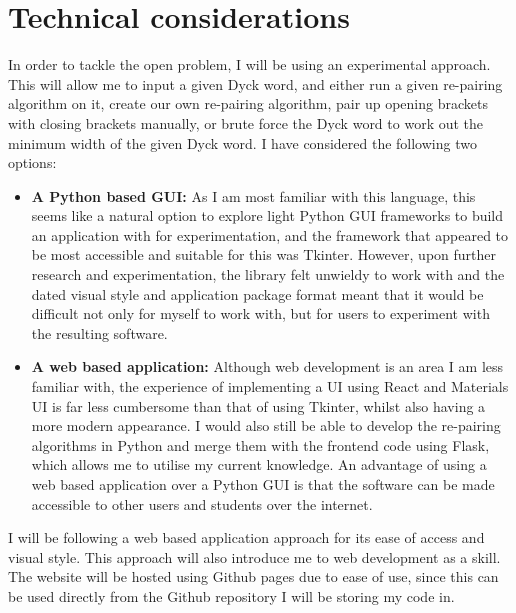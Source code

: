 \documentclass[a4paper]{article}
\begin{document}
\section{Technical considerations}
In order to tackle the open problem, I will be using an experimental approach. This will allow me to input a given Dyck word, and either run a given re-pairing algorithm on it, create our own re-pairing algorithm, pair up opening brackets with closing brackets manually, or brute force the Dyck word to work out the minimum width of the given Dyck word. I have considered the following two options:
\begin{itemize}
	\item \textbf{A Python based GUI:} As I am most familiar with this language, this seems like a natural option to explore light Python GUI frameworks to build an application with for experimentation, and the framework that appeared to be most accessible and suitable for this was Tkinter. However, upon further research and experimentation, the library felt unwieldy to work with and the dated visual style and application package format meant that it would be difficult not only for myself to work with, but for users to experiment with the resulting software.
	\item \textbf{A web based application:} Although web development is an area I am less familiar with, the experience of implementing a UI using React and Materials UI is far less cumbersome than that of using Tkinter, whilst also having a more modern appearance. I would also still be able to develop the re-pairing algorithms in Python and merge them with the frontend code using Flask, which allows me to utilise my current knowledge. An advantage of using a web based application over a Python GUI is that the software can be made accessible to other users and students over the internet.
\end{itemize}
I will be following a web based application approach for its ease of access and visual style. This approach will also introduce me to web development as a skill. The website will be hosted using Github pages due to ease of use, since this can be used directly from the Github repository I will be storing my code in.
\end{document}
